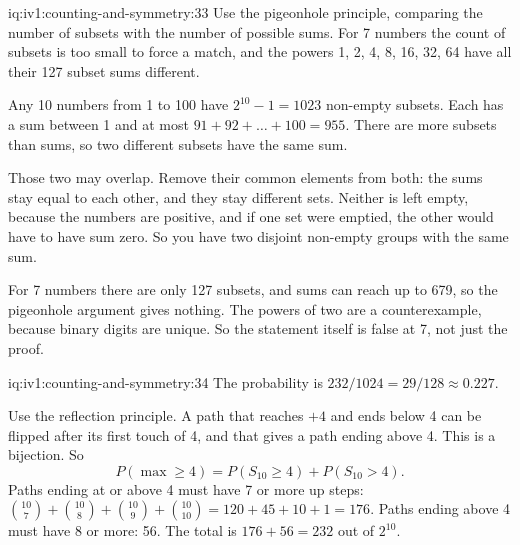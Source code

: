 \begin{solution}{iq:iv1:counting-and-symmetry:33}
Use the pigeonhole principle, comparing the number of subsets with the number of possible sums. For 7 numbers the count of subsets is too small to force a match, and the powers 1, 2, 4, 8, 16, 32, 64 have all their 127 subset sums different.

Any 10 numbers from 1 to 100 have $2^{10} - 1 = 1023$ non-empty subsets. Each has a sum between 1 and at most $91 + 92 + \dots + 100 = 955$. There are more subsets than sums, so two different subsets have the same sum.

Those two may overlap. Remove their common elements from both: the sums stay equal to each other, and they stay different sets. Neither is left empty, because the numbers are positive, and if one set were emptied, the other would have to have sum zero. So you have two disjoint non-empty groups with the same sum.

For 7 numbers there are only 127 subsets, and sums can reach up to 679, so the pigeonhole argument gives nothing. The powers of two are a counterexample, because binary digits are unique. So the statement itself is false at 7, not just the proof.

\end{solution}

\begin{solution}{iq:iv1:counting-and-symmetry:34}
The probability is $232/1024 = 29/128 \approx 0.227$.

Use the reflection principle. A path that reaches $+4$ and ends below 4 can be flipped after its first touch of 4, and that gives a path ending above 4. This is a bijection. So
\[
P(\max \ge 4) = P(S_{10} \ge 4) + P(S_{10} > 4).
\]
Paths ending at or above 4 must have 7 or more up steps: $\binom{10}{7} + \binom{10}{8} + \binom{10}{9} + \binom{10}{10} = 120 + 45 + 10 + 1 = 176$. Paths ending above 4 must have 8 or more: 56. The total is $176 + 56 = 232$ out of $2^{10}$.

\end{solution}

